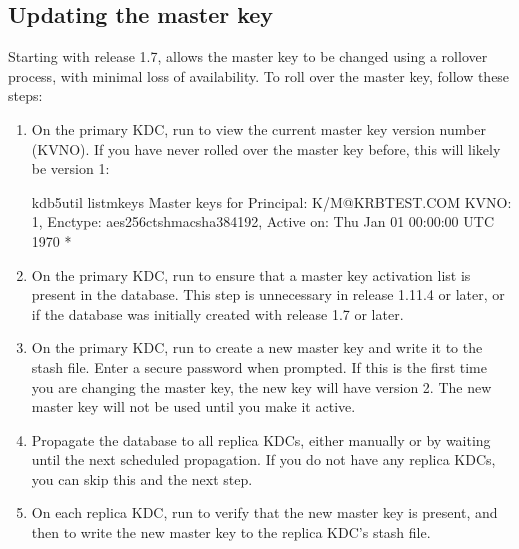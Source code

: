 \documentclass[letterpaper,10pt,english]{sphinxmanual}
\begin{document}
\subsection{Updating the master key}
\label{\detokenize{admin/database:updating-master-key}}\label{\detokenize{admin/database:updating-the-master-key}}
Starting with release 1.7, {\hyperref[\detokenize{admin/admin_commands/kdb5_util:kdb5-util-8}]{}} allows the master key
to be changed using a rollover process, with minimal loss of
availability.  To roll over the master key, follow these steps:
\begin{enumerate}
\item {} 
On the primary KDC, run  to view the
current master key version number (KVNO).  If you have never rolled
over the master key before, this will likely be version 1:

%
\begin{sphinxVerbatim}[commandchars=\\\{\}]
\PYGZdl{} kdb5\PYGZus{}util list\PYGZus{}mkeys
Master keys for Principal: K/M@KRBTEST.COM
KVNO: 1, Enctype: aes256\PYGZhy{}cts\PYGZhy{}hmac\PYGZhy{}sha384\PYGZhy{}192, Active on: Thu Jan 01 00:00:00 UTC 1970 *
\end{sphinxVerbatim}

\item {} 
On the primary KDC, run  to ensure that a
master key activation list is present in the database.  This step
is unnecessary in release 1.11.4 or later, or if the database was
initially created with release 1.7 or later.

\item {} 
On the primary KDC, run  to create a new
master key and write it to the stash file.  Enter a secure password
when prompted.  If this is the first time you are changing the
master key, the new key will have version 2.  The new master key
will not be used until you make it active.

\item {} 
Propagate the database to all replica KDCs, either manually or by
waiting until the next scheduled propagation.  If you do not have
any replica KDCs, you can skip this and the next step.

\item {} 
On each replica KDC, run  to verify that
the new master key is present, and then  to
write the new master key to the replica KDC’s stash file.


\end{enumerate}
\end{document}
